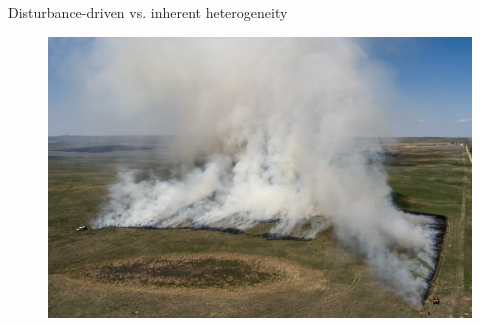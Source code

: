 \documentclass[11pt]{beamer}
\begin{document}
\begin{frame}{Disturbance-driven vs. inherent heterogeneity}
\begin{center}
\begin{figure}
 \includegraphics[width=1\linewidth]{figs/StreeterFire_17} 
 \end{figure}
\end{center}
\end{frame}
\end{document}
